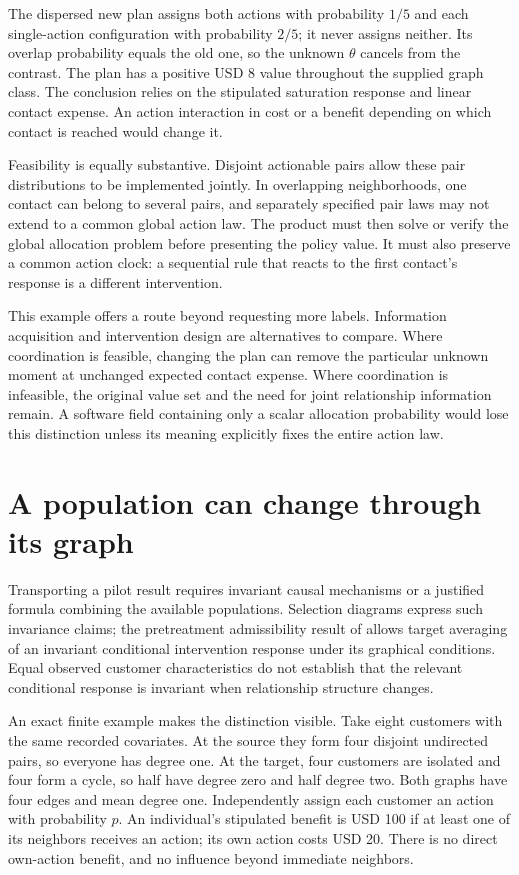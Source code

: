 The dispersed new plan assigns both actions with probability $1/5$ and each
single-action configuration with probability $2/5$; it never assigns neither.
Its overlap probability equals the old one, so the unknown $\theta$ cancels
from the contrast. The plan has a positive USD 8 value throughout the supplied
graph class. The conclusion relies on the stipulated saturation response and
linear contact expense. An action interaction in cost or a benefit depending
on which contact is reached would change it.~\citep{exec17_s7_math}

Feasibility is equally substantive. Disjoint actionable pairs allow these
pair distributions to be implemented jointly. In overlapping neighborhoods,
one contact can belong to several pairs, and separately specified pair laws
may not extend to a common global action law. The product must then solve or
verify the global allocation problem before presenting the policy value.
It must also preserve a common action clock: a sequential rule that reacts
to the first contact's response is a different intervention.

This example offers a route beyond requesting more labels. Information
acquisition and intervention design are alternatives to compare. Where
coordination is feasible, changing the plan can remove the particular unknown
moment at unchanged expected contact expense. Where coordination is infeasible,
the original value set and the need for joint relationship information remain.
A software field containing only a scalar allocation probability would lose
this distinction unless its meaning explicitly fixes the entire action law.

\section{A population can change through its graph}
\label{exec17:s7-topology}

Transporting a pilot result requires invariant causal mechanisms or a justified
formula combining the available populations. Selection diagrams express such
invariance claims; the pretreatment admissibility result of
\citet[Theorem 2 and Corollary 1]{pearltransport2014} allows target averaging of
an invariant conditional intervention response under its graphical conditions.
Equal observed customer characteristics do not establish that the relevant
conditional response is invariant when relationship structure changes.

An exact finite example makes the distinction visible. Take eight customers
with the same recorded covariates. At the source they form four disjoint
undirected pairs, so everyone has degree one. At the target, four customers
are isolated and four form a cycle, so half have degree zero and half degree
two. Both graphs have four edges and mean degree one. Independently assign
each customer an action with probability $p$. An individual's stipulated
benefit is USD 100 if at least one of its neighbors receives an action; its
own action costs USD 20. There is no direct own-action benefit, and no
influence beyond immediate neighbors.

